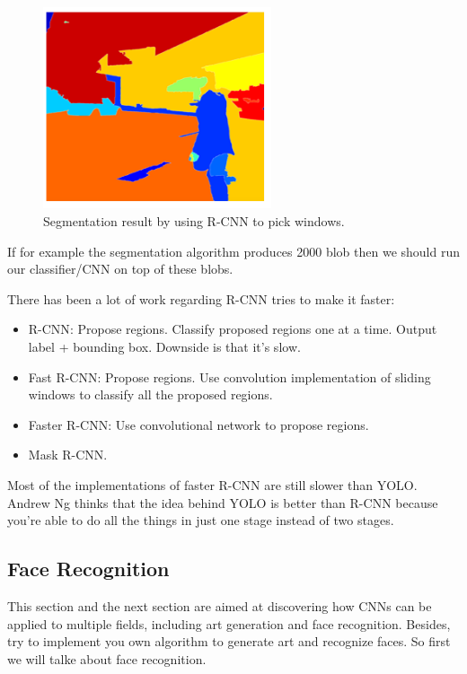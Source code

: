 \begin{figure}
    \centering
    \includegraphics[width=0.6\textwidth]{img/c4/rcnn1.png}
    \caption{Segmentation result by using R-CNN to pick windows.}
    \label{rcnn1}
\end{figure}

If for example the segmentation algorithm produces 2000 blob then we should run our classifier/CNN on top of these blobs.

There has been a lot of work regarding R-CNN tries to make it faster:

\begin{itemize}
    \item R-CNN\cite{girshick2014rich}: Propose regions. Classify proposed regions one at a time. Output label + bounding box. Downside is that it's slow.
    \item Fast R-CNN\cite{girshick2015fast}: Propose regions. Use convolution implementation of sliding windows to classify all the proposed regions.
    \item Faster R-CNN\cite{ren2015faster}: Use convolutional network to propose regions.
    \item Mask R-CNN\cite{he2017mask}.
\end{itemize}

Most of the implementations of faster R-CNN are still slower than YOLO. Andrew Ng thinks that the idea behind YOLO is better than R-CNN because you're able to do all the things in just one stage instead of two stages.


\subsection{Face Recognition}
This section and the next section are aimed at discovering how CNNs can be applied to multiple fields, including art generation and face recognition. Besides, try to implement you own algorithm to generate art and recognize faces. So first we will talke about face recognition.

